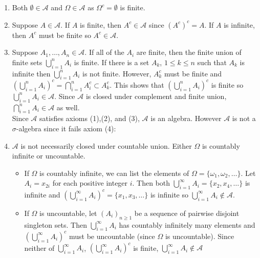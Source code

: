 \documentclass{article}
\begin{document}
\begin{enumerate}
\item Both $\emptyset \in \mathcal{A}$ and $\Omega \in \mathcal{A}$ as $\Omega^c = \emptyset$ is finite.

\item Suppose $A \in \mathcal{A}$. If $A$ is finite, then $A^c \in \mathcal{A}$ since $(A^c)^c = A$. If $A$ is infinite, then $A^c$ must be finite so $A^c \in \mathcal{A}$. 

\item Suppose $A_1, \dots , A_n \in \mathcal{A}$. If all of the $A_i$ are finite, then the finite union of finite sets $\bigcup_{i=1}^n A_i$ is finite. If there is a set $A_k$, $1\leq k \leq n$ such that $A_k$ is infinite then $\bigcup_{i=1}^n A_i$ is not finite. However, $A_k^c$ must be finite and $(\bigcup_{i=1}^n A_i)^c = \bigcap_{i=1}^n A_i^c \subset A_k^c$. This shows that $(\bigcup_{i=1}^n A_i)^c$ is finite so $\bigcup_{i=1}^n A_i \in \mathcal{A}$. Since $\mathcal{A}$ is closed under complement and finite union, $\bigcap_{i=1}^n A_i \in \mathcal{A}$ as well. \\

Since $\mathcal{A}$ satisfies axioms (1),(2), and (3), $\mathcal{A}$ is an algebra. However $\mathcal{A}$ is not a $\sigma$-algebra since it fails axiom (4):

\item $\mathcal{A}$ is not necessarily closed under countable union. Either $\Omega$ is countably infinite or uncountable. 

\begin{itemize}
\item If $\Omega$ is countably infinite, we can list the elements of $\Omega = \{\omega_1, \omega_2, \dots \}$. Let $A_i = x_{2i}$ for each positive integer $i$. Then both $\bigcup_{i=1}^\infty A_i = \{x_2, x_4, \dots \}$ is infinite and $\left(\bigcup_{i=1}^\infty A_i\right)^c = \{x_1,x_3, \dots\}$ is infinite so $\bigcup_{i=1}^\infty A_i \notin \mathcal{A}$. 

\item If $\Omega$ is uncountable, let $(A_i)_{n\geq 1}$ be a sequence of pairwise disjoint singleton sets. Then $\bigcup_{i=1}^\infty A_i$ has countably infinitely many elements and $\left(\bigcup_{i=1}^\infty A_i\right)^c$ must be uncountable (since $\Omega$ is uncountable). Since neither of $\bigcup_{i=1}^\infty A_i$, $\left(\bigcup_{i=1}^\infty A_i\right)^c$ is finite, $\bigcup_{i=1}^\infty A_i \notin \mathcal{A}$
\end{itemize}

\end{enumerate}
\end{document}
